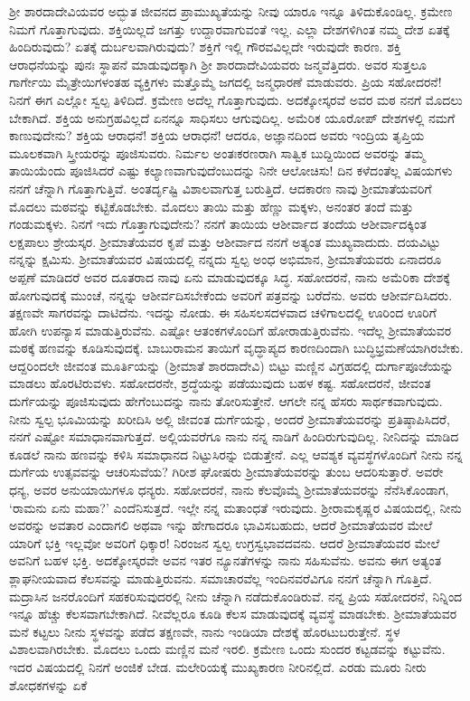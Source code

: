ಶ‍್ರೀ ಶಾರದಾದೇವಿಯವರ ಅದ್ಭುತ ಜೀವನದ ಪ್ರಾಮುಖ್ಯತೆಯನ್ನು ನೀವು ಯಾರೂ ಇನ್ನೂ ತಿಳಿದುಕೊಂಡಿಲ್ಲ. ಕ್ರಮೇಣ ನಿಮಗೆ ಗೊತ್ತಾಗುವುದು. ಶಕ್ತಿಯಿಲ್ಲದೆ ಜಗತ್ತು ಉದ್ದಾರವಾಗುವಂತೆ ಇಲ್ಲ. ಎಲ್ಲಾ ದೇಶಗಳಿಗಿಂತ ನಮ್ಮ ದೇಶ ಏತಕ್ಕೆ ಹಿಂದಿರುವುದು? ಏತಕ್ಕೆ ದುರ್ಬಲವಾಗಿರುವುದು? ಶಕ್ತಿಗೆ ಇಲ್ಲಿ ಗೌರವವಿಲ್ಲದೇ ಇರುವುದೇ ಕಾರಣ. ಶಕ್ತಿ ಆರಾಧನೆಯನ್ನು ಪುನಃ ಸ್ಥಾಪನೆ ಮಾಡುವುದಕ್ಕಾಗಿ ಶ‍್ರೀ ಶಾರದಾದೇವಿಯವರು ಜನ್ಮವೆತ್ತಿದರು. ಅವರ ಸುತ್ತಲೂ ಗಾರ್ಗೇಯಿ ಮೈತ್ರೇಯಿಗಳಂತಹ ವ್ಯಕ್ತಿಗಳು ಮತ್ತೊಮ್ಮೆ ಜಗದಲ್ಲಿ ಜನ್ಮಧಾರಣೆ ಮಾಡುವರು. ಪ್ರಿಯ ಸಹೋದರನೆ! ನಿನಗೆ ಈಗ ಎಲ್ಲೋ ಸ್ವಲ್ಪ ತಿಳಿದಿದೆ. ಕ್ರಮೇಣ ಅದೆಲ್ಲ ಗೊತ್ತಾಗುವುದು. ಅದಕ್ಕೋಸ್ಕರವೆ ಅವರ ಮಠ ನನಗೆ ಮೊದಲು ಬೇಕಾಗಿದೆ. ಶಕ್ತಿಯ ಅನುಗ್ರಹವಿಲ್ಲದೆ ಏನನ್ನೂ ಸಾಧಿಸಲು ಆಗುವುದಿಲ್ಲ. ಅಮೆರಿಕ ಯೂರೋಪ್ ದೇಶಗಳಲ್ಲಿ ನಮಗೆ ಕಾಣುವುದೇನು? ಶಕ್ತಿಯ ಆರಾಧನೆ! ಶಕ್ತಿಯ ಆರಾಧನೆ! ಆದರೂ, ಅಜ್ಞಾನದಿಂದ ಅವರು ಇಂದ್ರಿಯ ತೃಪ್ತಿಯ ಮೂಲಕವಾಗಿ ಸ್ತ್ರೀಯರನ್ನು ಪೂಜಿಸುವರು. ನಿರ್ಮಲ ಅಂತಃಕರಣರಾಗಿ ಸಾತ್ವಿಕ ಬುದ್ದಿಯಿಂದ ಅವರನ್ನು ತಮ್ಮ ತಾಯಿಯೆಂದು ಪೂಜಿಸಿದರೆ ಎಷ್ಟು ಕಲ್ಯಾಣವಾಗುವುದೆಂಬುದನ್ನು ನಿನೇ ಆಲೋಚಿಸು! ದಿನ ಕಳೆದಂತೆಲ್ಲ ವಿಷಯಗಳು ನನಗೆ ಚೆನ್ನಾಗಿ ಗೊತ್ತಾಗುತ್ತಿವೆ. ಅಂತರ್ದೃಷ್ಟಿ ವಿಶಾಲವಾಗುತ್ತ ಬರುತ್ತಿದೆ. ಆದಕಾರಣ ನಾವು ಶ‍್ರೀಮಾತೆಯವರಿಗೆ ಮೊದಲು ಮಠವನ್ನು ಕಟ್ಟಿಕೊಡಬೇಕು. ಮೊದಲು ತಾಯಿ ಮತ್ತು ಹೆಣ್ಣು ಮಕ್ಕಳು, ಅನಂತರ ತಂದೆ ಮತ್ತು ಗಂಡುಮಕ್ಕಳು. ನಿನಗೆ ಇದು ಗೊತ್ತಾಗುವುದೇನು? ನನಗೆ ತಾಯಿಯ ಆಶೀರ್ವಾದ ತಂದೆಯ ಆಶೀರ್ವಾದಕ್ಕಿಂತ ಲಕ್ಷಪಾಲು ಶ್ರೇಯಸ್ಕರ. ಶ‍್ರೀಮಾತೆಯವರ ಕೃಪೆ ಮತ್ತು ಆಶೀರ್ವಾದ ನನಗೆ ಅತ್ಯಂತ ಮುಖ್ಯವಾದುದು. ದಯವಿಟ್ಟು ನನ್ನನ್ನು ಕ್ಷಮಿಸು. ಶ‍್ರೀಮಾತೆಯವರ ವಿಷಯದಲ್ಲಿ ನನ್ನದು ಸ್ವಲ್ಪ ಅಂಧ ಅಭಿಮಾನ, ಶ‍್ರೀಮಾತೆಯವರು ಏನಾದರೂ ಅಪ್ಪಣೆ ಮಾಡಿದರೆ ಅವರ ದೂತರಾದ ನಾವು ಏನು ಮಾಡುವುದಕ್ಕೂ ಸಿದ್ಧ. ಸಹೋದರನೆ, ನಾನು ಅಮೆರಿಕಾ ದೇಶಕ್ಕೆ ಹೋಗುವುದಕ್ಕೆ ಮುಂಚೆ, ನನ್ನನ್ನು ಆಶೀರ್ವದಿಸಬೇಕೆಂದು ಅವರಿಗೆ ಪತ್ರವನ್ನು ಬರೆದೆನು. ಅವರು ಆಶೀರ್ವದಿಸಿದರು. ತಕ್ಷಣವೇ ಸಾಗರವನ್ನು ದಾಟಿದೆನು. ಇದನ್ನು ನೋಡು. ಈ ಸಹಿಸಲಸದಳವಾದ ಚಳಿಗಾಲದಲ್ಲಿ ಊರಿಂದ ಊರಿಗೆ ಹೋಗಿ ಉಪನ್ಯಾಸ ಮಾಡುತ್ತಿರುವೆನು. ಎಷ್ಟೋ ಆತಂಕಗಳೊಂದಿಗೆ ಹೋರಾಡುತ್ತಿರುವೆನು. ಇದೆಲ್ಲ ಶ‍್ರೀಮಾತೆಯವರ ಮಠಕ್ಕೆ ಹಣವನ್ನು ಕೂಡಿಸುವುದಕ್ಕೆ. ಬಾಬುರಾಮನ ತಾಯಿಗೆ ವೃದ್ಧಾಪ್ಯದ ಕಾರಣದಿಂದಾಗಿ ಬುದ್ಧಿಭ್ರಮಣೆಯಾಗಿರಬೇಕು. ಆದ್ದರಿಂದಲೇ ಜೀವಂತ ಮೂರ್ತಿಯನ್ನು (ಶ‍್ರೀಮಾತೆ ಶಾರದಾದೇವಿ) ಬಿಟ್ಟು ಮಣ್ಣಿನ ವಿಗ್ರಹದಲ್ಲಿ ದುರ್ಗಾಪೂಜೆಯನ್ನು ಮಾಡಲು ಹೊರಟಿರುವಳು. ಸಹೋದರನೇ, ಶ್ರದ್ಧೆಯನ್ನು ಪಡೆಯುವುದು ಬಹಳ ಕಷ್ಟ. ಸಹೋದರನೆ, ಜೀವಂತ ದುರ್ಗೆಯನ್ನು ಪೂಜಿಸುವುದು ಹೇಗೆಂಬುದನ್ನು ನಾನು ತೋರಿಸುತ್ತೇನೆ. ಆಗಲೇ ನನ್ನ ಹೆಸರು ಸಾರ್ಥಕವಾಗುವುದು. ನೀನು ಸ್ವಲ್ಪ ಭೂಮಿಯನ್ನು ಖರೀದಿಸಿ ಅಲ್ಲಿ ಜೀವಂತ ದುರ್ಗೆಯನ್ನು, ಅಂದರೆ  ಶ‍್ರೀಮಾತೆ\break ಯವರನ್ನು ಪ್ರತಿಷ್ಠಾಪಿಸಿದರೆ, ನನಗೆ ಎಷ್ಟೋ ಸಮಾಧಾನವಾಗುತ್ತದೆ. ಅಲ್ಲಿಯವರೆಗೂ ನಾನು ನನ್ನ ನಾಡಿಗೆ ಹಿಂದಿರುಗುವುದಿಲ್ಲ. ನೀನಿದನ್ನು ಮಾಡಿದ ಕೂಡಲೆ ನಾನು ಹಣವನ್ನು ಕಳಿಸಿ ಸಮಾಧಾನದ ನಿಟ್ಟುಸಿರನ್ನು ಬಿಡುತ್ತೇನೆ. ಎಲ್ಲ ಆವಶ್ಯಕ ವ್ಯವಸ್ಥೆಗಳೊಂದಿಗೆ ನೀನು ನನ್ನ ದುರ್ಗೆಯ ಉತ್ಸವವನ್ನು ಆಚರಿಸುವೆಯ? ಗಿರೀಶ ಘೋಷರು ಶ‍್ರೀಮಾತೆಯವರನ್ನು ತುಂಬ ಆದರಿಸುತ್ತಾರೆ. ಅವರೇ ಧನ್ಯ, ಅವರ ಅನುಯಾಯಿಗಳೂ ಧನ್ಯರು. ಸಹೋದರನೆ, ನಾನು ಕೆಲವೊಮ್ಮೆ ಶ‍್ರೀಮಾತೆಯವರನ್ನು ನೆನೆಸಿಕೊಂಡಾಗ, `ರಾಮನು ಏನು ಮಹಾ?'\enginline{-} ಎಂದೆನಿಸುತ್ತದೆ. ಇಲ್ಲೇ ನನ್ನ ಮತಾಂಧತೆ ಇರುವುದು. ಶ‍್ರೀರಾಮಕೃಷ್ಣರ ವಿಷಯದಲ್ಲಿ, ನೀನು ಅವರನ್ನು ಅವತಾರ ಎಂದಾಗಲಿ ಅಥವಾ ಇನ್ನು ಹೇಗಾದರೂ ಭಾವಿಸಬಹುದು, ಆದರೆ ಶ‍್ರೀಮಾತೆಯವರ ಮೇಲೆ ಯಾರಿಗೆ ಭಕ್ತಿ ಇಲ್ಲವೋ ಅವರಿಗೆ ಧಿಕ್ಕಾರ! ನಿರಂಜನ ಸ್ವಲ್ಪ ಉಗ್ರಸ್ವಭಾವದವನು. ಆದರೆ ಶ‍್ರೀಮಾತೆಯವರ ಮೇಲೆ ಅವನಿಗೆ ಬಹಳ ಭಕ್ತಿ. ಅದಕ್ಕೋಸ್ಕರವೇ ಅವನ ಇತರ ನ್ಯೂನತೆಗಳನ್ನು ನಾನು ಸಹಿಸುವೆನು. ಅವನು ಈಗ ಅತ್ಯಂತ ಶ್ಲಾಘನೀಯವಾದ ಕೆಲಸವನ್ನು ಮಾಡುತ್ತಿರುವನು. ಸಮಾಚಾರವೆಲ್ಲ ಇಂದಿನವರೆವಿಗೂ ನನಗೆ ಚೆನ್ನಾಗಿ ಗೊತ್ತಿದೆ. ಮದ್ರಾಸಿನ ಜನರೊಂದಿಗೆ ಸಹಕರಿಸುವುದರಲ್ಲಿ ನೀನು ಚೆನ್ನಾಗಿ ನಡೆದುಕೊಂಡಿರುವೆ. ನನ್ನ ಪ್ರಿಯ ಸಹೋದರನೆ, ನಿನ್ನಿಂದ ಇನ್ನೂ ಹೆಚ್ಚು ಕೆಲಸವಾಗಬೇಕಾಗಿದೆ. ನೀವೆಲ್ಲರೂ ಕೂಡಿ ಕೆಲಸ ಮಾಡುವುದಕ್ಕೆ ವ್ಯವಸ್ಥೆ ಮಾಡಬೇಕು. ಶ‍್ರೀಮಾತೆಯವರ ಮನೆ ಕಟ್ಟಲು ನೀನು ಸ್ಥಳವನ್ನು ಪಡೆದ ತಕ್ಷಣವೇ, ನಾನು ಇಂಡಿಯಾ ದೇಶಕ್ಕೆ ಹೊರಟುಬರುತ್ತೇನೆ. ಸ್ಥಳ ವಿಶಾಲವಾಗಿರಬೇಕು. ಮೊದಲು ಒಂದು ಮಣ್ಣಿನ ಮನೆ ಇರಲಿ. ಕ್ರಮೇಣ ಒಂದು ಸುಂದರ ಕಟ್ಟಡವನ್ನು ಕಟ್ಟುವೆನು. ಇದರ ವಿಷಯದಲ್ಲಿ ನಿನಗೆ ಅಂಜಿಕೆ ಬೇಡ. ಮಲೇರಿಯಕ್ಕೆ ಮುಖ್ಯಕಾರಣ ನೀರಿನಲ್ಲಿದೆ. ಎರಡು ಮೂರು ನೀರು ಶೋಧಕಗಳನ್ನು ಏಕೆ 